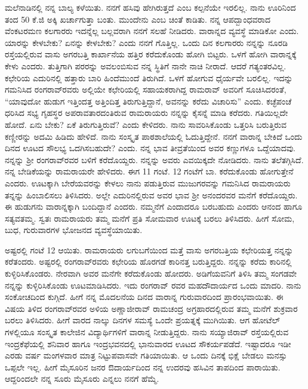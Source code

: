 {ಮಲೆನಾಡಿನಲ್ಲಿ ನನ್ನ ಬಾಲ್ಯ ಕಳೆಯಿತು.  ನನಗೆ ಹಸಿವು ಹೇಗಿರುತ್ತದೆ ಎಂಬ ಕಲ್ಪನೆಯೇ ಇರಲಿಲ್ಲ.  ನಾನು ಊರಿನಿಂದ  ತಂದ 50 ಕೆ.ಜಿ ಅಕ್ಕಿ ಖರ್ಚಾಗುತ್ತಾ ಬಂತು.  ಮುಂದೇನು ಎಂಬ ಚಿಂತೆ ಕಾಡಿತು.  ನನ್ನ ಆಪದ್ಬಾಂಧವರಾದ ವೆಂಕಟರಮಣ ಕಲ\-ಗಾರರು ಇದನ್ನೆಲ್ಲ ಬಲ್ಲವರಾಗಿ ನನಗೆ ಸಲಹೆ ನೀಡಿದರು.  ವಾರಾನ್ನದ ವ್ಯವಸ್ಥೆ ಮಾಡಿಕೋ ಎಂದು.  ಯಾರನ್ನು ಕೇಳಬೇಕು? ಏನನ್ನು ಕೇಳಬೇಕು? ಎಂದು ನನಗೆ ಗೊತ್ತಿಲ್ಲ.  ಒಂದು ದಿನ ಕಲಗಾರರು ನನ್ನನ್ನು ನೂರಡಿ ರಸ್ತೆಯಲ್ಲಿರುವ ವಾಸು ಅಗರಬತ್ತಿ ಕಾರ್ಖಾನೆಯ ಹತ್ತಿರ ಕರೆದುಕೊಂಡು ಹೋಗಿ ಬಿಟ್ಟರು.  ಒಳಗೆ ಹೋಗಿ ವಾರಾನ್ನಕ್ಕೆ ಕೇಳು ಎಂದರು.  ತುತ್ತಿಗಾಗಿ ಪರರನ್ನು ಅವಲಂಬಿಸುವ ನನ್ನ ಸ್ಥಿತಿಗೆ ನಾನೇ ನಾಚಿ ನೀರಾದೆ.  ಆದರೆ ಗತ್ಯಂತರವಿಲ್ಲ.  ಕಛೇರಿಯ ಎದುರಿನಲ್ಲಿ ಹತ್ತಾರು ಬಾರಿ ಹಿಂದೆಮುಂದೆ ತಿರುಗಿದೆ.  ಒಳಗೆ ಹೋಗುವ ಧೈರ್ಯವೇ ಬರಲಿಲ್ಲ.  ಇದನ್ನು ಗಮನಿಸಿದ ರಂಗರಾವ್‍ರವರು ಅಲ್ಲಿಯೇ ಕಛೇರಿಯಲ್ಲಿ ಸಹಾಯಕರಾಗಿದ್ದ ರಾಮರಾವ್ ಅವರಿಗೆ ಸೂಚಿಸಿದರಂತೆ,  “ಯಾವುದೋ ಹುಡುಗ ಇತ್ತಿಂದತ್ತ ಅತ್ತಿಂದಿತ್ತ  ತಿರುಗುತ್ತಿದ್ದಾನೆ, ಅವನನ್ನು ಕರೆದು ವಿಚಾರಿಸು” ಎಂದು.  ಕಚ್ಛೆಪಂಚೆ ಧರಿಸಿದ ಸಭ್ಯ ಗೃಹಸ್ಥರ ಅಪರಾವತಾರದಂತಿರುವ ರಾಮರಾಯರು ನನ್ನನ್ನು ಕೈಸನ್ನೆ ಮಾಡಿ ಕರೆದರು.  ಗತಿಯಿಲ್ಲದೇ ಹೋದೆ. ಏನು ಬೇಕು? ಏಕೆ ತಿರುಗುತ್ತಿರುವೆ? ಎಂದು ಕೇಳಿದರು.  ನಾನು ಸಾವರಿಸಿಕೊಂಡು ಒತ್ತರಿಸಿ ಬರುತ್ತಿರುವ ಕಣ್ಣೀರನ್ನು ಅದಮಿ ಹಿಡಿದು ಹೇಳಿದೆ.  ನಾನು ಸಂಸ್ಕೃತ ಪಾಠಶಾಲೆಯಲ್ಲಿ ಓದುತ್ತಿದ್ದೇನೆ. ನನಗೆ ವಾರಾನ್ನ ಬೇಕಿದೆ ಒಂದು ದಿನದ ಊಟದ ಸೌಲಭ್ಯ ಒದಗಿಸಬಹುದೇ? ಎಂದು.  ನನ್ನ ಭಾವ ತೀವ್ರತೆಯಿಂದ ಅವರ ಕಣ್ಣುಗಳೂ ಒದ್ದೆಯಾದವು.  ನನ್ನನ್ನು ಶ್ರೀ ರಂಗರಾವ್‍ರವರ ಬಳಿಗೆ ಕರೆದೊಯ್ದರು.  ನನ್ನನ್ನು ಅವರು ಎವಯಿಕ್ಕದೇ ನೋಡಿದರು.  ನಾನು ತಲೆತಗ್ಗಿಸಿದೆ.  ನನ್ನ ಬೇಡಿಕೆಯನ್ನು ರಾಮರಾಯರೇ ಹೇಳಿದರು.  ಈಗ 11 ಗಂಟೆ. 12 ಗಂಟೆಗೆ ಬಾ. ಕರೆದುಕೊಂಡು ಹೋಗುತ್ತೇನೆ ಎಂದರು.  ಊಟಕ್ಕಾಗಿ ಬೇರೆಯವರನ್ನು ಕೇಳಲು ನಾನು ಪಡುತ್ತಿರುವ ಮುಜುಗರವನ್ನು ಗಮನಿಸಿದ ರಾಮರಾಯರು ತನ್ನನ್ನು ಹಿಂಬಾಲಿಸಲು ತಿಳಿಸಿದರು.  ಅಲ್ಲೇ ಎದುರಿನಲ್ಲಿರುವ ಅವರ ಭಾವ ಶ್ರೀ ಅನಂದರವರ ಮನೆಗೆ ಕರೆದೊಯ್ದರು.  ಈ ಹುಡುಗನು ವಾರಾನ್ನಕ್ಕಾಗಿ ಬಂದಿದ್ದಾನೆ ಎಂದರು. ನಮ್ಮನೆಗೆ ಎಂದಾದರೂ ಬರಬಹುದು ಎಂದರು ಆನಂದ ಹಾಗೂ ಸತ್ಯವತಮ್ಮ. ಸ್ವತಃ ರಾಮರಾಯರು ತಮ್ಮ ಮನೆಗೆ ಪ್ರತಿ ಸೋಮವಾರ ಊಟಕ್ಕೆ ಬರಲು ತಿಳಿಸಿದರು.  ಹೀಗೆ ಸೋಮ, ಬುಧ, ಗುರುವಾರಗಳ ಭೋಜನದ ವ್ಯವಸ್ಥೆಯಾಯಿತು. 

ಅಷ್ಟರಲ್ಲಿ ಗಂಟೆ 12 ಆಯಿತು.  ರಾಮರಾಯರು ಲಗುಬಗೆಯಿಂದ ಮತ್ತೆ ವಾಸು ಅಗರಬತ್ತಿಯ ಕಛೇರಿಯತ್ತ ನನ್ನನ್ನು ಕರೆತಂದರು.  ಅಷ್ಟರಲ್ಲಿ ರಂಗರಾವ್‍ರವರು ಕಛೇರಿಯ ಹೊರಗಡೆ ಕಾರಿನತ್ತ ಬರುತ್ತಿದ್ದರು.  ನನ್ನನ್ನು ಕರೆದು ಕಾರಿನಲ್ಲಿ ಕುಳ್ಳಿರಿಸಿ\-ಕೊಂಡರು.  ನೇರವಾಗಿ ಅವರ ಮನೆಗೇ ಕರೆದುಕೊಂಡು ಹೋದರು.  ಅಡಿಗೆಯವನಿಗೆ ತಿಳಿಸಿ ತಮ್ಮ ಸಂಗಡವೇ ನನ್ನನ್ನು ಕುಳ್ಳಿರಿಸಿ\-ಕೊಂಡು ಊಟಮಾಡಿಸಿದರು.  ಇದು ರಂಗರಾವ್ ರವರ ಮಹದೌದಾರ್ಯದ ಒಂದು ಮಾದರಿ.  ನಾನು ಸಂಕೋಚದಿಂದ ಕುಗ್ಗಿದೆ.  ಹೀಗೆ ನನ್ನ ಮೊದಲನೆಯ ದಿನದ ವಾರಾನ್ನ ಗುರುವಾರದಿಂದ ಪ್ರಾರಂಭವಾಯಿತು. ಈ ವಿಷಯ ತಿಳಿದ ರಂಗರಾವ್‍ರವರ ಅಳಿಯ ಅಣ್ಣಾಜೀರಾವ್ ರಾಮಚಂದ್ರ ಅಗ್ರಹಾರದಲ್ಲಿರುವ ತಮ್ಮ ಮನೆಗೆ ಶುಕ್ರವಾರ ಬರಲು ತಿಳಿಸಿದರು.  ಹೀಗೆ ವಾರದ ನಾಲ್ಕು ದಿನಗಳ ಸಮಸ್ಯೆ ಒಂದೇ ಪ್ರಯತ್ನಕ್ಕೆ ಮುಗಿಯಿತು.  ಆಗ ಹೋಟೆಲ್ ಗಳಲ್ಲಿಯೂ ಸಂಸ್ಕೃತ ಕಾಲೇಜಿನ ವಿದ್ಯಾರ್ಥಿಗಳಿಗೆ ವಾರಾನ್ನ ನೀಡುತ್ತಿದ್ದರು.  ನಾನು ಸಯ್ಯಾಜಿರಾವ್ ರಸ್ತೆಯಲ್ಲಿರುವ ಇಂದ್ರಕೆಫೆಯಲ್ಲಿ ಶನಿವಾರ ಹಾಗೂ ಇಂದ್ರಭವನದಲ್ಲಿ ಭಾನುವಾರದ ಊಟದ ಸೌಕರ್ಯ\-ಪಡೆದೆ.  ಇಷ್ಟಾದರೂ ಇಡೀ ಎರಡು ವರ್ಷ ಮಂಗಳವಾರ ಮಾತ್ರ ನಿಟ್ಟುಪವಾಸವೇ ಗತಿಯಾಯಿತು.  ಆ ಒಂದು ದಿನಕ್ಕೆ ಭಿಕ್ಷೆ ಬೇಡಲು ಮನಸ್ಸು ಒಪ್ಪಲೇ ಇಲ್ಲ.  ಹೀಗೆ ಮೈಸೂರಿನ ಜನರ ಔದಾರ್ಯದಿಂದ ನನ್ನ ಉದರವು ಹಸಿವಿನ ತಾಪದಿಂದ ಪಾರಾಯಿತು.  ಆದ್ದರಿಂದಲೇ ನನ್ನ ಸೂರು ಮೈಸೂರು ಎನ್ನಲು ನನಗೆ ಹೆಮ್ಮೆ.

}
